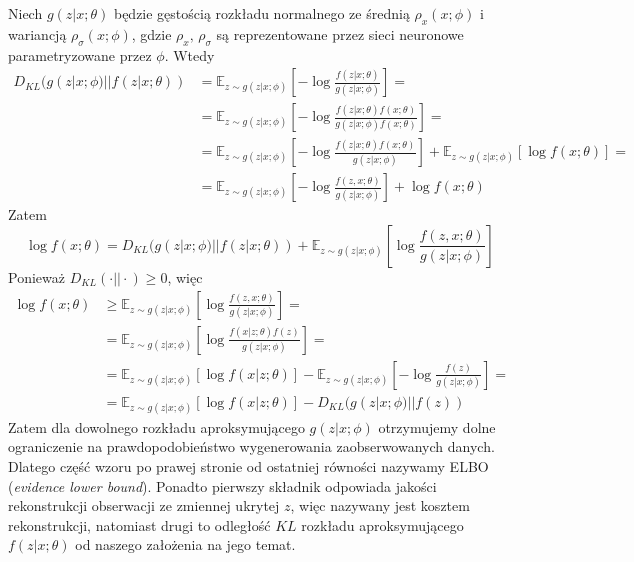 \documentclass[12pt]{extarticle}
\begin{document}
Niech $g(z|x; \theta)$ będzie gęstością
rozkładu normalnego ze średnią $\rho_x(x; \phi)$ i wariancją $\rho_{\sigma}(x; \phi)$,
gdzie $\rho_x,\,\rho_{\sigma}$ są reprezentowane przez sieci neuronowe
parametryzowane przez $\phi$. Wtedy
\begin{equation}
\begin{split}
D_{KL}(g(z|x;\phi) || f(z|x;\theta)) &= \mathbb{E}_{z\sim g(z|x;\phi)}\left[
-\log\frac{f(z|x;\theta)}{g(z|x;\phi)}\right]= \\
&=\mathbb{E}_{z\sim g(z|x;\phi)}\left[-\log\frac{f(z|x;\theta)f(x;\theta)}{g(z|x;\phi)f(x;\theta)}\right]= \\
&=\mathbb{E}_{z\sim g(z|x;\phi)}\left[-\log\frac{f(z|x;\theta)f(x;\theta)}{g(z|x;\phi)}\right] + \mathbb{E}_{z\sim g(z|x;\phi)}\left[\log f(x;\theta)\right] = \\
&=\mathbb{E}_{z\sim g(z|x;\phi)}\left[-\log\frac{f(z,x;\theta)}{g(z|x;\phi)}\right] +\log f(x;\theta)
\end{split}
\end{equation}
Zatem
\begin{equation}
\log f(x;\theta) = D_{KL}(g(z|x;\phi) || f(z|x;\theta)) + \mathbb{E}_{z\sim g(z|x;\phi)}\left[\log\frac{f(z,x;\theta)}{g(z|x;\phi)}\right]
\end{equation}
Ponieważ $D_{KL}(\cdotp || \cdotp) \geq 0$, więc
\begin{equation}
\begin{split}
\log f(x;\theta)  &\geq \mathbb{E}_{z\sim g(z|x;\phi)}\left[\log\frac{f(z,x;\theta)}{g(z|x;\phi)}\right] = \\
&= \mathbb{E}_{z\sim g(z|x;\phi)}\left[\log\frac{f(x|z;\theta)f(z)}{g(z|x;\phi)}\right] = \\
&=\mathbb{E}_{z\sim g(z|x;\phi)}\left[\log f(x|z;\theta)\right] - \mathbb{E}_{z\sim g(z|x;\phi)}\left[-\log\frac{f(z)}{g(z|x;\phi)}\right] =\\
&=\mathbb{E}_{z\sim g(z|x;\phi)}\left[\log f(x|z;\theta)\right] - D_{KL}(g(z|x;\phi) || f(z))
\end{split}
\end{equation}
Zatem dla dowolnego rozkładu aproksymującego $g(z|x;\phi)$ otrzymujemy dolne
ograniczenie na prawdopodobieństwo wygenerowania zaobserwowanych danych.
Dlatego część wzoru po prawej stronie od ostatniej równości
nazywamy ELBO (\textit{evidence lower bound}). Ponadto pierwszy składnik odpowiada
jakości rekonstrukcji obserwacji ze zmiennej ukrytej $z$, więc nazywany jest
kosztem rekonstrukcji, natomiast drugi to odległość $KL$ rozkładu aproksymującego
$f(z|x;\theta)$ od naszego założenia na jego temat.
\end{document}
